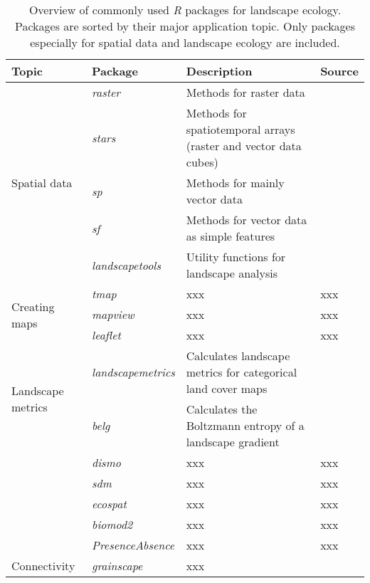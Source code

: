 \documentclass[smallextended]{svjour3}       %
\begin{document}
\begin{landscape}

\begin{center}
  \begin{table}
    \begin{tabularx}{0.9\linewidth}{XXXX}
      \caption{Overview of commonly used \textit{R} packages for landscape ecology. Packages are sorted by their major application topic. Only packages especially for spatial data and landscape ecology are included.} \\
      \hline
      Topic & Package & Description & Source \\
      \hline
      \multirow{5}{*}{Spatial data} & \textit{raster} & Methods for raster data & \cite{Hijmans2019} \\
      & \textit{stars} & Methods for spatiotemporal arrays (raster and vector data cubes) & \cite{Pebesma2019} \\
      & \textit{sp} & Methods for mainly vector data & \cite{Pebesma2005,Bivand2013} \\
      & \textit{sf} & Methods for vector data as simple features & \cite{Pebesma2018} \\
      & \textit{landscapetools} & Utility functions for landscape analysis & \cite{Sciaini2018} \\
      \hline
      \multirow{3}{*}{Creating maps} & \textit{tmap} & xxx & xxx \\
      & \textit{mapview} & xxx & xxx \\
      & \textit{leaflet} & xxx & xxx \\
      \hline
      \multirow{2}{*}{Landscape metrics} & \textit{landscapemetrics} & Calculates landscape metrics for categorical land cover maps & \cite{Hesselbarth2019a} \\
      & \textit{belg} & Calculates the Boltzmann entropy of a landscape gradient & \cite{Nowosad2019a} \\
      \hline
      \multirow{5}{*}{}Species distribution modeling (SDM) & \textit{dismo} & xxx & xxx \\
      & \textit{sdm} & xxx & xxx \\
      & \textit{ecospat} & xxx & xxx \\
      & \textit{biomod2} & xxx & xxx \\
      & \textit{PresenceAbsence} & xxx & xxx \\
      \hline
      \multirow{3}{*}{Connectivity} & \textit{grainscape} & xxx & \cite{Chubaty2020} \\

\end{tabularx}
\end{table}
\end{center}
\end{landscape}
\end{document}
